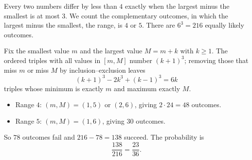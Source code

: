 Every two numbers differ by less than $4$ exactly when the largest minus the smallest is at most $3$. We count the complementary outcomes, in which the largest minus the smallest, the range, is $4$ or $5$. There are $6^3=216$ equally likely outcomes.

Fix the smallest value $m$ and the largest value $M=m+k$ with $k\ge1$. The ordered triples with all values in $[m,M]$ number $(k+1)^3$; removing those that miss $m$ or miss $M$ by inclusion--exclusion leaves
\[(k+1)^3-2k^3+(k-1)^3=6k\]
triples whose minimum is exactly $m$ and maximum exactly $M$.
\begin{itemize}
\item Range $4$: $(m,M)=(1,5)$ or $(2,6)$, giving $2\cdot24=48$ outcomes.
\item Range $5$: $(m,M)=(1,6)$, giving $30$ outcomes.
\end{itemize}
So $78$ outcomes fail and $216-78=138$ succeed. The probability is
\[\dfrac{138}{216}=\boxed{\dfrac{23}{36}}.\]
